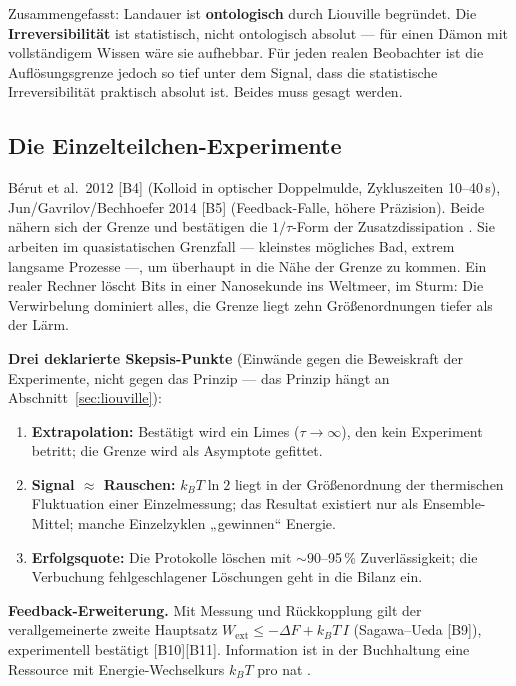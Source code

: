 Zusammengefasst: Landauer ist \textbf{ontologisch} durch Liouville begründet. Die
\textbf{Irreversibilität} ist statistisch, nicht ontologisch absolut --- für einen
Dämon mit vollständigem Wissen wäre sie aufhebbar. Für jeden realen Beobachter ist
die Auflösungsgrenze jedoch so tief unter dem Signal, dass die statistische
Irreversibilität praktisch absolut ist. Beides muss gesagt werden.

\subsection{Die Einzelteilchen-Experimente}

Bérut et al.\ 2012 [B4] (Kolloid in optischer Doppelmulde, Zykluszeiten
10--40\,s), Jun/Gavrilov/Bechhoefer 2014 [B5] (Feedback-Falle, höhere Präzision).
Beide nähern sich der Grenze und bestätigen die $1/\tau$-Form der
Zusatzdissipation . Sie arbeiten im quasistatischen Grenzfall ---
kleinstes mögliches Bad, extrem langsame Prozesse ---, um überhaupt in die Nähe
der Grenze zu kommen. Ein realer Rechner löscht Bits in einer Nanosekunde ins
Weltmeer, im Sturm: Die Verwirbelung dominiert alles, die Grenze liegt zehn
Größenordnungen tiefer als der Lärm.

\textbf{Drei deklarierte Skepsis-Punkte} (Einwände gegen die Beweiskraft der
Experimente, nicht gegen das Prinzip --- das Prinzip hängt an
Abschnitt~\ref{sec:liouville}):

\begin{enumerate}[leftmargin=1.6em,itemsep=0.25em]
  \item \textbf{Extrapolation:} Bestätigt wird ein Limes ($\tau\to\infty$), den
        kein Experiment betritt; die Grenze wird als Asymptote gefittet.
  \item \textbf{Signal $\approx$ Rauschen:} $k_B T \ln 2$ liegt in der
        Größenordnung der thermischen Fluktuation einer Einzelmessung; das
        Resultat existiert nur als Ensemble-Mittel; manche Einzelzyklen
        „gewinnen“ Energie.
  \item \textbf{Erfolgsquote:} Die Protokolle löschen mit ${\sim}90$--95\,\%
        Zuverlässigkeit; die Verbuchung fehlgeschlagener Löschungen geht in die
        Bilanz ein.
\end{enumerate}

\LK \textbf{Feedback-Erweiterung.} Mit Messung und Rückkopplung gilt der
verallgemeinerte zweite Hauptsatz $W_{\text{ext}} \le -\Delta F + k_B T\,I$
(Sagawa--Ueda [B9]), experimentell bestätigt [B10][B11]. Information ist in der
Buchhaltung eine Ressource mit Energie-Wechselkurs $k_B T$ pro nat
.

